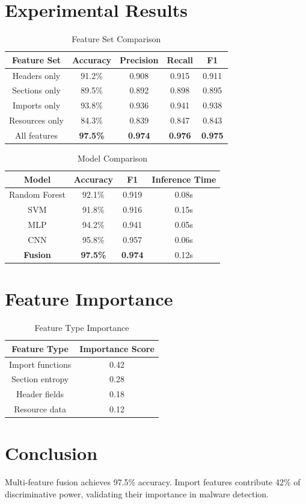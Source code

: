 \documentclass[conference]{IEEEtran}
\begin{document}
\section{Experimental Results}

\begin{table}[htbp]
\caption{Feature Set Comparison}
\begin{center}
\begin{tabular}{|c|c|c|c|c|}
\hline
\textbf{Feature Set} & \textbf{Accuracy} & \textbf{Precision} & \textbf{Recall} & \textbf{F1} \\
\hline
Headers only & 91.2\% & 0.908 & 0.915 & 0.911 \\
Sections only & 89.5\% & 0.892 & 0.898 & 0.895 \\
Imports only & 93.8\% & 0.936 & 0.941 & 0.938 \\
Resources only & 84.3\% & 0.839 & 0.847 & 0.843 \\
All features & \textbf{97.5\%} & \textbf{0.974} & \textbf{0.976} & \textbf{0.975} \\
\hline
\end{tabular}
\label{tab:features}
\end{center}
\end{table}

\begin{table}[htbp]
\caption{Model Comparison}
\begin{center}
\begin{tabular}{|c|c|c|c|}
\hline
\textbf{Model} & \textbf{Accuracy} & \textbf{F1} & \textbf{Inference Time} \\
\hline
Random Forest & 92.1\% & 0.919 & 0.08s \\
SVM & 91.8\% & 0.916 & 0.15s \\
MLP & 94.2\% & 0.941 & 0.05s \\
CNN & 95.8\% & 0.957 & 0.06s \\
\textbf{Fusion} & \textbf{97.5\%} & \textbf{0.974} & 0.12s \\
\hline
\end{tabular}
\label{tab:models}
\end{center}
\end{table}

\section{Feature Importance}

\begin{table}[htbp]
\caption{Feature Type Importance}
\begin{center}
\begin{tabular}{|c|c|}
\hline
\textbf{Feature Type} & \textbf{Importance Score} \\
\hline
Import functions & 0.42 \\
Section entropy & 0.28 \\
Header fields & 0.18 \\
Resource data & 0.12 \\
\hline
\end{tabular}
\label{tab:importance}
\end{center}
\end{table}

\section{Conclusion}

Multi-feature fusion achieves 97.5\% accuracy. Import features contribute 42\% of discriminative power, validating their importance in malware detection.
\end{document}
